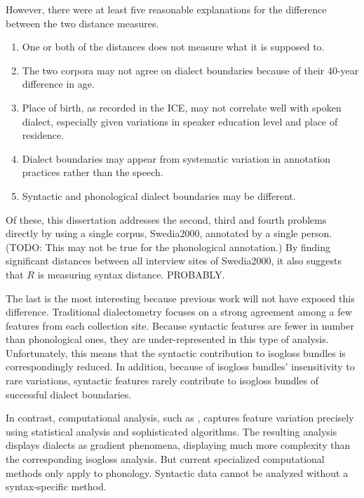 However, there were at least five reasonable explanations for the difference
between the two distance measures.

\begin{enumerate}
\item One or both of the distances does not measure what it is supposed to.
\item The two corpora may not agree on dialect boundaries because of
  their 40-year difference in age.
\item Place of birth, as recorded in the ICE, may not correlate well
  with spoken dialect, especially given variations in speaker
  education level and place of residence.
\item Dialect boundaries may appear from systematic variation in
  annotation practices rather than the speech.
\item Syntactic and phonological dialect boundaries may be different.
\end{enumerate}

Of these, this dissertation addresses the second, third and fourth
problems directly by using a single corpus, Swedia2000, annotated by a single
person. (TODO: This may not be true for the phonological annotation.)
By finding significant distances between all interview sites of
Swedia2000, it also suggests that $R$ is measuring syntax
distance. PROBABLY.

The last is the most interesting because previous work will not have
exposed this difference. Traditional dialectometry focuses on a strong
agreement among a few features from each collection site. Because
syntactic features are fewer in number than phonological ones, they
are under-represented in this type of analysis. Unfortunately, this
means that the syntactic contribution to isogloss bundles is
correspondingly reduced. In addition, because of isogloss bundles'
insensitivity to rare variations, syntactic features rarely contribute
to isogloss bundles of successful dialect boundaries.

In contrast, computational analysis, such as \cite{shackleton07},
captures feature variation precisely using statistical analysis and
sophisticated algorithms. The resulting analysis displays dialects as
gradient phenomena, displaying much more complexity than the
corresponding isogloss analysis. But current specialized computational
methods only apply to phonology. Syntactic data cannot be analyzed
without a syntax-specific method.

